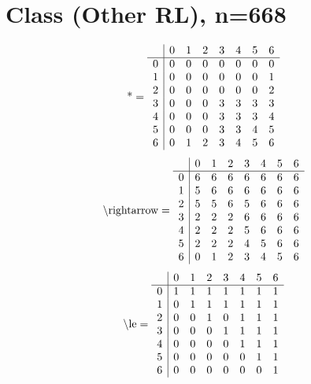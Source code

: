 \documentclass[11pt]{article}
\begin{document}
\section{Class (Other RL), n=668}
\[\text{*} = 
\begin{array}{r | r r r r r r r}
 & 0 & 1 & 2 & 3 & 4 & 5 & 6 \\ \hline
0 & 0 & 0 & 0 & 0 & 0 & 0 & 0 \\
1 & 0 & 0 & 0 & 0 & 0 & 0 & 1 \\
2 & 0 & 0 & 0 & 0 & 0 & 0 & 2 \\
3 & 0 & 0 & 0 & 3 & 3 & 3 & 3 \\
4 & 0 & 0 & 0 & 3 & 3 & 3 & 4 \\
5 & 0 & 0 & 0 & 3 & 3 & 4 & 5 \\
6 & 0 & 1 & 2 & 3 & 4 & 5 & 6 \\
\end{array}
\]
\[\text{\textbackslash rightarrow} = 
\begin{array}{r | r r r r r r r}
 & 0 & 1 & 2 & 3 & 4 & 5 & 6 \\ \hline
0 & 6 & 6 & 6 & 6 & 6 & 6 & 6 \\
1 & 5 & 6 & 6 & 6 & 6 & 6 & 6 \\
2 & 5 & 5 & 6 & 5 & 6 & 6 & 6 \\
3 & 2 & 2 & 2 & 6 & 6 & 6 & 6 \\
4 & 2 & 2 & 2 & 5 & 6 & 6 & 6 \\
5 & 2 & 2 & 2 & 4 & 5 & 6 & 6 \\
6 & 0 & 1 & 2 & 3 & 4 & 5 & 6 \\
\end{array}
\]
\[\text{\textbackslash le} = 
\begin{array}{r | r r r r r r r}
 & 0 & 1 & 2 & 3 & 4 & 5 & 6 \\ \hline
0 & 1 & 1 & 1 & 1 & 1 & 1 & 1 \\
1 & 0 & 1 & 1 & 1 & 1 & 1 & 1 \\
2 & 0 & 0 & 1 & 0 & 1 & 1 & 1 \\
3 & 0 & 0 & 0 & 1 & 1 & 1 & 1 \\
4 & 0 & 0 & 0 & 0 & 1 & 1 & 1 \\
5 & 0 & 0 & 0 & 0 & 0 & 1 & 1 \\
6 & 0 & 0 & 0 & 0 & 0 & 0 & 1 \\
\end{array}
\]
\end{document}
